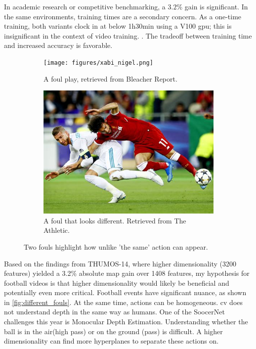 In academic research or competitive benchmarking, a $3.2\%$ gain is significant. In the same environments, training times are a secondary concern. As a one-time training, both variants clock in at below 1h30min using a V100 \acrshort{gpu}; this is insignificant in the context of video training. . The tradeoff between training time and increased accuracy is favorable. 


\begin{figure}
  \begin{subfigure}{0.42\textwidth}
    \texttt{[image: figures/xabi\_nigel.png]}
        \caption{A foul play, retrieved from Bleacher Report\cite{wyman_2018}.} 
        \label{fig:serious_foul}
  \end{subfigure}%
  \hspace*{\fill}   %
  \begin{subfigure}{0.42\textwidth}
    \includegraphics[width=\linewidth]{figures/salah_foul.png}
    \caption{A foul that looks different. Retrieved from The Athletic\cite{corrigan_2021}.} 
    \label{fig:another_foul}
  \end{subfigure}%
  \hspace*{\fill}   
  \caption{Two fouls highlight how unlike 'the same' action can appear. }
  \label{fig:different_fouls}
\end{figure}

Based on the findings from THUMOS-14, where higher dimensionality (3200 features) yielded a 3.2\% absolute \acrshort{map} gain over 1408 features, my hypothesis for football videos is that higher dimensionality would likely be beneficial and potentially even more critical. Football events have significant nuance, as shown in \autoref{fig:different_fouls}. At the same time, actions can be homogeneous. \acrshort{cv} does not understand depth in the same way as humans. One of the SoocerNet challenges this year is Monocular Depth Estimation. Understanding whether the ball is in the air(high pass) or on the ground (pass) is difficult. A higher dimensionality can find more hyperplanes to separate these actions on. 

